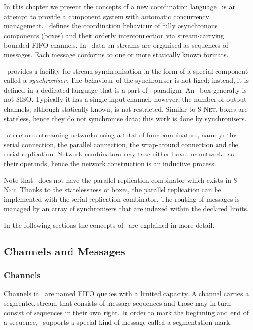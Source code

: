 \chapter{\ak\ }
In this chapter we present the concepts of a new coordination language \ak\. \ak\ is an attempt to provide a component system with automatic concurrency management. \ak\ defines the coordination behaviour of fully asynchronous components (boxes) and their orderly interconnection via stream-carrying bounded FIFO channels. In \ak\, data on streams are organised as sequences of messages. Each message conforms to one or more statically known formats.

\ak\ provides a facility for stream synchronisation in the form of a special component called a \emph{synchroniser}. The behaviour of the synchroniser is not fixed; instead, it is defined in a dedicated language that is a part of \ak\ paradigm. An \ak\ box generally is not SISO. Typically it has a single input channel, however, the number of output channels, although statically known, is not restricted. Similar to \textsc{S-Net}, boxes are stateless, hence they do not synchronise data; this work is done by synchronisers.

\ak\ structures streaming networks using a total of four combinators, namely: the serial connection, the parallel connection, the wrap-around connection and the serial replication. Network combinators may take either boxes or networks as their operands, hence the network construction is an inductive process. 

Note that \ak\ does not have the parallel replication combinator which exists in \textsc{S-Net}. Thanks to the statelessness of boxes, the parallel replication can be implemented with the serial replication combinator. The routing of messages is managed by an array of synchronisers that are indexed within the declared limits.

In the following sections the concepts of \ak\ are explained in more detail.


\section{Channels and Messages}
    \subsection*{Channels}
Channels in \ak\ are named FIFO queues with a limited capacity. A channel carries a segmented stream that consists of message sequences and those may in turn consist of sequences in their own right. In order to mark the beginning and end of a sequence, \ak\ supports a special kind of message called a segmentation mark.

